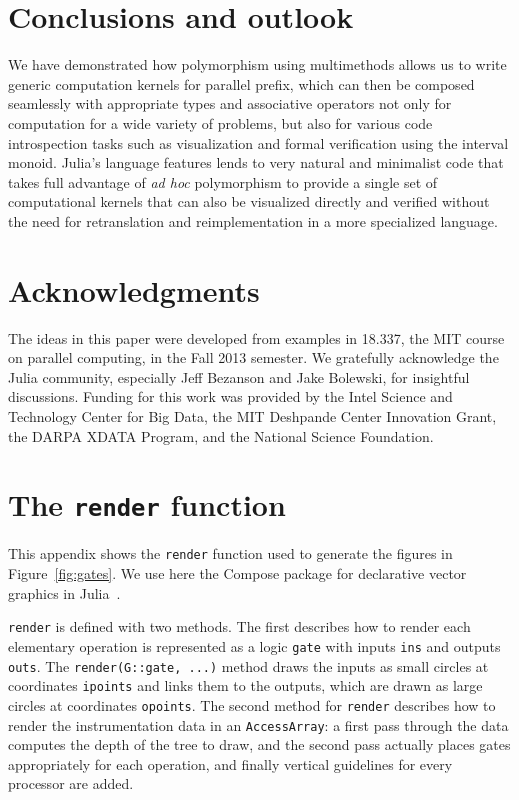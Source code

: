 \documentclass{sig-alternate}
\newcommand{\code}[1]{\texttt{#1}}
\begin{document}
\section{Conclusions and outlook}

We have demonstrated how polymorphism using multimethods allows us to write
generic computation kernels for parallel prefix, which can then be composed
seamlessly with appropriate types and associative operators not only for
computation for a wide variety of problems, but also for various code
introspection tasks such as visualization and formal verification using the
interval monoid. Julia's language features lends to very natural and minimalist
code that takes full advantage of \textit{ad hoc} polymorphism to provide a
single set of computational kernels that can also be visualized directly and
verified without the need for retranslation and reimplementation in a more
specialized language.

\section{Acknowledgments}

The ideas in this paper were developed from examples in 18.337, the MIT course
on parallel computing, in the Fall 2013 semester. We gratefully acknowledge the
Julia community, especially Jeff Bezanson and Jake Bolewski, for insightful
discussions. Funding for this work was provided by the Intel Science and
Technology Center for Big Data, the MIT Deshpande Center Innovation Grant, the
DARPA XDATA Program, and the National Science Foundation.




\appendix

\section{The \code{render} function}
\label{sec:render}

This appendix shows the \code{render} function used to generate the figures in
Figure~\ref{fig:gates}. We use here the Compose package for declarative vector
graphics in Julia~\cite{Compose.jl}.

\code{render} is defined with two methods. The first describes how to render
each elementary operation is represented as a logic \code{gate} with inputs
\code{ins} and outputs \code{outs}. The \code{render(\allowbreak{}G::gate, ...)} method
draws the inputs as small circles at coordinates \code{ipoints} and links them
to the outputs, which are drawn as large circles at coordinates \code{opoints}.
The second method for \code{render} describes how to render the instrumentation
data in an \code{AccessArray}: a first pass through the data computes the depth
of the tree to draw, and the second pass actually places gates appropriately
for each operation, and finally vertical guidelines for every processor are
added.
\end{document}
